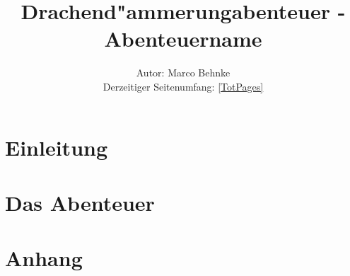 

\title{Drachend"ammerungabenteuer -\\Abenteuername}
\author{Autor: Marco Behnke\\
      Derzeitiger Seitenumfang: \ref{TotPages}
      }


        \sffamily
        \frontmatter
                \maketitle\newpage
                \tableofcontents
        
        \mainmatter
                \part{Einleitung}
            
                \part{Das Abenteuer}
            
            
            
                \part{Anhang}
                        \appendix
            
            

